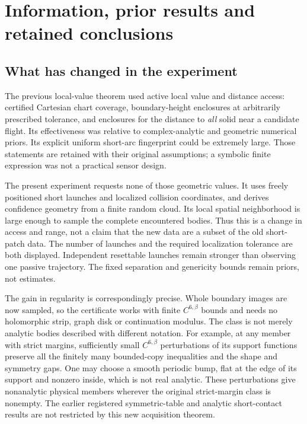 \section{Information, prior results and retained conclusions}\label{sec:comparison}
\subsection{What has changed in the experiment}
The previous local-value theorem used active local value and distance
access: certified Cartesian chart coverage, boundary-height enclosures
at arbitrarily prescribed tolerance, and enclosures for the distance to
\emph{all} solid near a candidate flight. Its effectiveness was relative
to complex-analytic and geometric numerical priors. Its explicit uniform
short-arc fingerprint could be extremely large. Those statements are
retained with their original assumptions; a symbolic finite expression
was not a practical sensor design.

The present experiment requests none of those geometric values. It
uses freely positioned short launches and localized collision coordinates,
and derives confidence geometry from a finite random cloud. Its local
spatial neighborhood is large enough to sample the complete encountered
bodies. Thus this is a change in access and range, not a claim that the
new data are a subset of the old short-patch data. The number of launches
and the required localization tolerance are both displayed. Independent
resettable launches remain stronger than observing one passive trajectory.
The fixed separation and genericity bounds remain priors, not estimates.

The gain in regularity is correspondingly precise. Whole boundary images
are now sampled, so the certificate works with finite $C^{6,\beta}$ bounds
and needs no holomorphic strip, graph disk or continuation modulus. The
class is not merely analytic bodies described with different notation.
For example, at any member with strict margins, sufficiently small
$C^{6,\beta}$ perturbations of its support functions preserve all the
finitely many bounded-copy inequalities and the shape and symmetry gaps.
One may choose a smooth periodic bump, flat at the edge of its support
and nonzero inside, which is not real analytic. These perturbations give
nonanalytic physical members wherever the original strict-margin class
is nonempty. The earlier registered symmetric-table and analytic
short-contact results are not restricted by this new acquisition theorem.

